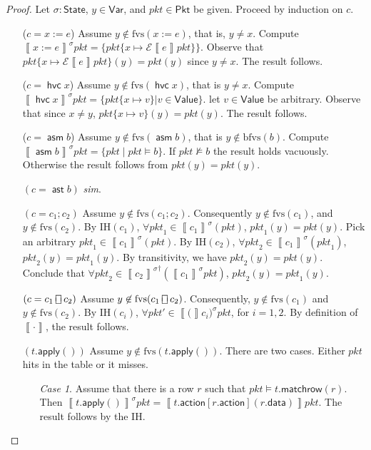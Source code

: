 \documentclass{article}
\newcommand{\pkt}{\mathit{pkt}}
\newcommand{\denote}[1]{\left\llbracket#1\right\rrbracket}
\newcommand{\edenote}[1]{\mathcal{E}\denote{#1}}
\newcommand{\Value}{\mathsf{Value}}
\newcommand{\Pkt}{\mathsf{Pkt}}
\newcommand{\Var}{\mathsf{Var}}
\newcommand{\State}{\mathsf{State}}
\newcommand{\action}{\mathsf{action}}
\newcommand{\data}{\mathsf{data}}
\newcommand{\assert}{\mathop{\mathsf{ast}}}
\newcommand{\assume}{\mathop{\mathsf{asm}}}
\newcommand{\apply}{\mathsf{apply}}
\newcommand{\choiceop}{\rotatebox[origin=c]{90}{$\sqsubset\!\!\!\sqsupset$}}
\newcommand{\choice}{\mathbin{\choiceop}}
\newcommand{\havoc}[1]{\mathop{\mathsf{hvc}}#1}
\newcommand{\fvs}{\textrm{fvs}}
\newcommand{\bfvs}{\textrm{bfvs}}
\newcommand{\matchrow}{\mathsf{matchrow}}
\begin{document}
\begin{proof}
  Let $\sigma : \State $, $y \in \Var$, and $\pkt \in \Pkt$ be given.
  Proceed by induction on $c$.
  \begin{enumerate}[align=left]
  \item[($c = x := e$)] Assume $y \not \in \fvs(x:=e)$, that is, $y \neq x$.
    Compute $\denote{x:=e}^\sigma \pkt = \{\pkt\{ x \mapsto \edenote e
    \pkt\}\}$. Observe that $\pkt\{ x \mapsto \edenote e \pkt\}(y) = \pkt(y)$
    since $y \neq x$. The result follows.

  \item[($c = \havoc x$)] Assume $y \not \in \fvs(\havoc x)$, that is $y \neq
    x$. Compute $\denote{\havoc x}^\sigma\pkt = \{\pkt\{x \mapsto v\} | v \in
    \Value\}$. let $v \in \Value$ be arbitrary. Observe that since $x \neq y$,
    $\pkt\{x \mapsto v\}(y) = \pkt(y)$. The result follows.

  \item[($c = \assume b$)] Assume $y \not \in \fvs(\assume b)$, that is $y
    \not\in \bfvs(b)$. Compute $\denote{\assume b}^\sigma \pkt = \{\pkt \mid
    \pkt \models b\}$. If $\pkt \not\models b$ the result holds vacuously.
    Otherwise the result follows from $\pkt(y) = \pkt(y)$.

  \item[$(c = \assert b)$] \textit{sim}.

  \item[$(c = c_1;c_2)$] Assume $y \not \in \fvs(c_1;c_2)$. Consequently $y
    \not\in \fvs(c_1)$, and $y \not \in \fvs(c_2)$. By IH$(c_1)$, $\forall
    \pkt_1 \in \denote{c_1}^\sigma(\pkt)$, $\pkt_1(y) = pkt(y)$. Pick an
    arbitrary $\pkt_1 \in \denote{c_1}^\sigma(\pkt)$. By IH$(c_2)$, $\forall
    \pkt_2 \in \denote{c_1}^\sigma(\pkt_1)$, $\pkt_2(y) = \pkt_1(y)$. By
    transitivity, we have $\pkt_2(y) = \pkt(y)$. Conclude that $\forall \pkt_2
    \in {\denote{c_2}^\sigma}^\dagger (\denote{c_1}^\sigma \pkt)$, $\pkt_2(y) =
    \pkt_1(y)$.

  \item[$(c = c_1 \choice c_2)$] Assume $y \not \in \fvs(c_1 \choice c_2)$.
    Consequently, $y \not \in \fvs(c_1)$ and $y \not \in \fvs(c_2)$.
    By IH$(c_i)$, $\forall \pkt' \in \denote(c_i)^\sigma\pkt$, for $i = 1,2$.
    By definition of $\denote{\cdot}$, the result follows.

  \item[$(t.\apply())$] Assume $y \not\in \fvs(t.\apply())$.
    There are two cases. Either $\pkt$ hits in the table or it misses.
    \begin{enumerate}[align=left]
    \item[\textit{Case 1}.] Assume that there is a row $r$ such that $\pkt
      \models t.\matchrow(r)$. Then $\denote{t.\apply()}^\sigma \pkt =
      \denote{t.\action[r.\action](r.\data)} \pkt$. The result follows by the
      IH.


\end{enumerate}
\end{enumerate}
\end{proof}
\end{document}
